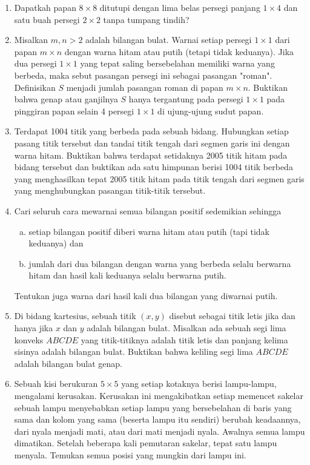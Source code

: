 \documentclass[12pt]{scrartcl}
\begin{document}
\begin{enumerate}[resume]
\item
    Dapatkah papan $8\times8$ ditutupi dengan lima belas persegi panjang $1\times4$ dan satu buah persegi $2\times2$ tanpa tumpang tindih?


\item
    Misalkan $m,n > 2$ adalah bilangan bulat. Warnai setiap persegi $1\times1$ dari papan $m\times n$ dengan warna hitam atau putih (tetapi tidak keduanya). Jika dua persegi $1\times1$ yang tepat saling bersebelahan memiliki warna yang berbeda, maka sebut pasangan persegi ini sebagai pasangan "roman". Definisikan $S$ menjadi jumlah pasangan roman di papan $m\times n$. Buktikan bahwa genap atau ganjilnya $S$ hanya tergantung pada persegi $1\times1$ pada pinggiran papan selain 4 persegi $1\times1$ di ujung-ujung sudut papan.


\item
    Terdapat 1004 titik yang berbeda pada sebuah bidang. Hubungkan setiap pasang titik tersebut dan tandai titik tengah dari segmen garis ini dengan warna hitam. Buktikan bahwa terdapat setidaknya 2005 titik hitam pada bidang tersebut dan buktikan ada satu himpunan berisi 1004 titik berbeda yang menghasilkan tepat 2005 titik hitam pada titik tengah dari segmen garis yang menghubungkan pasangan titik-titik tersebut.


\item
    Cari seluruh cara mewarnai semua bilangan positif sedemikian sehingga 
    \begin{enumerate}[(a)]
        \item setiap bilangan positif diberi warna hitam atau putih (tapi tidak keduanya) dan \item jumlah dari dua bilangan dengan warna yang berbeda selalu berwarna hitam dan hasil kali keduanya selalu berwarna putih.
    \end{enumerate}
     
    Tentukan juga warna dari hasil kali dua bilangan yang diwarnai putih.


\item
    Di bidang kartesius, sebuah titik $(x,y)$ disebut sebagai titik letis jika dan
hanya jika $x$ dan $y$ adalah bilangan bulat. Misalkan ada sebuah segi lima konveks $ABCDE$
yang titik-titiknya adalah titik letis dan panjang kelima sisinya adalah bilangan bulat.
Buktikan bahwa keliling segi lima $ABCDE$ adalah bilangan bulat genap.


\item
    Sebuah kisi berukuran $5 \times 5$ yang setiap kotaknya berisi lampu-lampu, mengalami kerusakan. Kerusakan ini mengakibatkan setiap memencet sakelar sebuah lampu menyebabkan setiap lampu yang bersebelahan di baris yang sama dan kolom yang sama (beserta lampu itu sendiri) berubah keadaannya, dari nyala menjadi mati, atau dari mati menjadi nyala. Awalnya semua lampu dimatikan. Setelah beberapa kali pemutaran sakelar, tepat satu lampu menyala. Temukan semua posisi yang mungkin dari lampu ini.



\end{enumerate}
\end{document}
